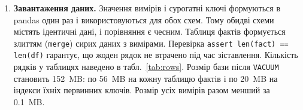 \begin{enumerate}
\begin{figure}[H]
\centering
{}
\caption{Схема «сніжинка»: ієрархії вимірів винесено в окремі таблиці}
\label{fig:snow}
\end{figure}

  \item \textbf{Завантаження даних.} Значення вимірів і сурогатні ключі формуються в pandas один раз і використовуються для обох схем. Тому обидві схеми містять ідентичні дані, і порівняння є чесним. Таблиця фактів формується злиттям (\texttt{merge}) сирих даних з вимірами. Перевірка \texttt{assert len(fact) == len(df)} гарантує, що жоден рядок не втрачено під час зіставлення. Кількість рядків у таблицях наведено в табл.~\ref{tab:rows}. Розмір бази після \texttt{VACUUM} становить 152~MB: по 56~MB на кожну таблицю фактів і по 20~MB на індекси їхніх первинних ключів. Розмір усіх вимірів разом менший за 0.1~MB.


\end{enumerate}

